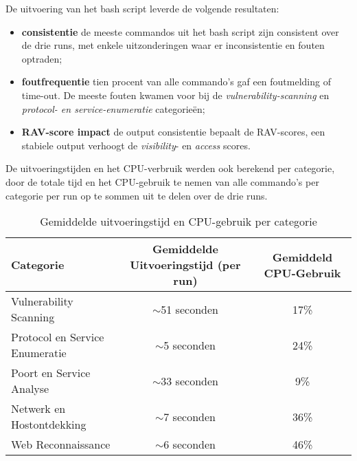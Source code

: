 De uitvoering van het bash script leverde de volgende resultaten:

\begin{itemize}
  \item \textbf{consistentie} de meeste commandos uit het bash script zijn consistent over de drie runs, met enkele uitzonderingen waar er inconsistentie en fouten optraden;
  \item \textbf{foutfrequentie} tien procent van alle commando's gaf een foutmelding of time-out. De meeste fouten kwamen voor bij de \textit{vulnerability-scanning} en \textit{protocol- en service-enumeratie} categorieën;
  \item \textbf{RAV-score impact} de output consistentie bepaalt de RAV-scores, een stabiele output verhoogt de \textit{visibility}- en \textit{access} scores.
  
\end{itemize}


De uitvoeringstijden en het CPU-verbruik werden ook berekend per categorie, door de totale tijd en het CPU-gebruik te nemen van alle commando's per categorie per run op te sommen uit te delen over de drie runs.

% 


\begin{table}[h]
  \centering
  \footnotesize
  \begin{tabular}{lcc}
  \toprule
  \textbf{Categorie} & \textbf{Gemiddelde Uitvoeringstijd (per run)} & \textbf{Gemiddeld CPU-Gebruik} \\
  \midrule
  Vulnerability Scanning & $\sim$51 seconden & 17\% \\
  Protocol en Service Enumeratie & $\sim$5 seconden & 24\% \\
  Poort en Service Analyse & $\sim$33 seconden & 9\% \\
  Netwerk en Hostontdekking & $\sim$7 seconden & 36\% \\
  Web Reconnaissance & $\sim$6 seconden & 46\% \\
  \bottomrule
  \end{tabular}
  \caption{Gemiddelde uitvoeringstijd en CPU-gebruik per categorie}{\label{tab:cpu-uitvoeringstijd}}
\end{table}

